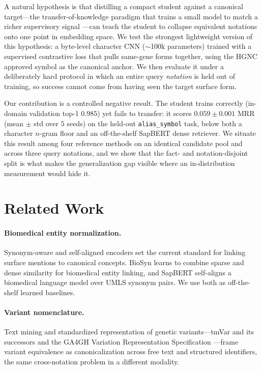 \documentclass[11pt]{article}
\begin{document}
A natural hypothesis is that distilling a compact student against a canonical
target---the transfer-of-knowledge paradigm that trains a small model to match a
richer supervisory signal \citep{bucila2006, hinton2015distilling}---can teach the
student to collapse equivalent notations onto one point in embedding space. We test
the strongest lightweight version of this hypothesis: a
byte-level character CNN ($\sim$100k parameters) trained with a supervised
contrastive loss \citep{supcon} that pulls same-gene forms together, using the
HGNC approved symbol as the canonical anchor. We then evaluate it under a
deliberately hard protocol in which an entire query \emph{notation} is held out of
training, so success cannot come from having seen the target surface form.

Our contribution is a controlled negative result. The student trains correctly
(in-domain validation top-1 $0.985$) yet fails to transfer: it scores
$0.059 \pm 0.001$ MRR (mean $\pm$ std over $5$ seeds)
on the held-out \texttt{alias\_symbol} task, below both a character $n$-gram floor
and an off-the-shelf SapBERT dense retriever. We situate this result among four
reference methods on an identical candidate pool and across three query notations,
and we show that the fact- and notation-disjoint split is what makes the
generalization gap visible where an in-distribution measurement would hide it.

\section{Related Work}
\label{sec:related}
\paragraph{Biomedical entity normalization.} Synonym-aware and self-aligned
encoders set the current standard for linking surface mentions to canonical
concepts. BioSyn \citep{biosyn} learns to combine sparse and dense similarity for
biomedical entity linking, and SapBERT \citep{sapbert} self-aligns a biomedical
language model over UMLS synonym pairs. We use both as off-the-shelf learned
baselines.
\paragraph{Variant nomenclature.} Text mining and standardized representation of
genetic variants---tmVar and its successors \citep{tmvar, tmvar2, tmvar3} and the
GA4GH Variation Representation Specification \citep{ga4ghvrs}---frame variant
equivalence as canonicalization across free text and structured identifiers,
the same cross-notation problem in a different modality.
\end{document}
